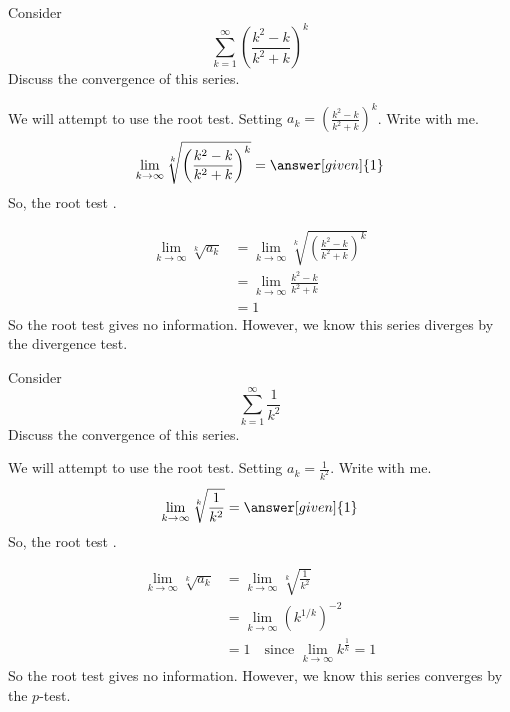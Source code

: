 \documentclass{ximera}
\begin{document}
\begin{example}
  Consider 
  \[
  \sum_{k=1}^\infty \left(\frac{k^2-k}{k^2+k}\right)^k
  \]
  Discuss the convergence of this series.
  \begin{explanation}
    We will attempt to use the root test. Setting
    $a_k=\left(\frac{k^2-k}{k^2+k}\right)^k$. Write with me.
    \[
    \lim_{k \to \infty} \sqrt[k]{\left(\frac{k^2-k}{k^2+k}\right)^k} = \answer[given]{1}	
    \]
    So, the root test
	  .		
	  \begin{hint}
            \begin{align*}
	      \lim_{k \to \infty} \sqrt[k]{a_k} &= \lim_{k \to \infty} \sqrt[k]{\left(\frac{k^2-k}{k^2+k}\right)^k}\\
	      &=\lim_{k \to \infty}\frac{k^2-k}{k^2+k}\\
	      &=1
	    \end{align*}
	    So the root test gives no information.  However, we know this series diverges by the divergence test.
	  \end{hint}
  \end{explanation}
\end{example}


\begin{example}
  Consider 
  \[
  \sum_{k=1}^\infty \frac{1}{k^2}
  \]
  Discuss the convergence of this series.
  \begin{explanation}
    We will attempt to use the root test. Setting
    $a_k=\frac{1}{k^2}$. Write with me.
    \[
    \lim_{k \to \infty} \sqrt[k]{\frac{1}{k^2}} = \answer[given]{1}	
    \]
    So, the root test
	  .		
	  \begin{hint}
            \begin{align*}
	      \lim_{k \to \infty} \sqrt[k]{a_k} &= \lim_{k \to \infty} \sqrt[k]{\frac{1}{k^2}}\\
	      &=\lim_{k \to \infty}\left(k^{1/k}\right)^{-2}\\
	      &=1 \quad\text{since $\lim_{k \to \infty} k^\frac{1}{k} = 1$}
	    \end{align*}
	    So the root test gives no information.  However, we know
            this series converges by the $p$-test.
	  \end{hint}
  \end{explanation}
\end{example}
\end{document}
